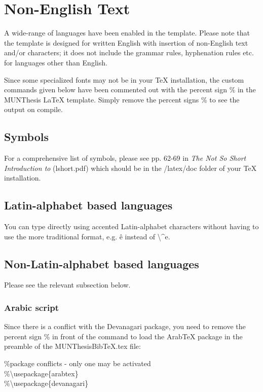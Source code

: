 \documentclass[12pt]{MUNThesisBibTeX}
\begin{document}
\chapter{Non-English Text}

A wide-range of languages have been enabled in the template. Please note that the template is designed for written English with insertion of non-English text and/or characters; it does not include the grammar rules, hyphenation rules etc. for languages other than English. 

Since some specialized fonts may not be in your TeX installation, the custom commands given below have been commented out with the percent sign \% in the MUNThesis LaTeX template. Simply remove the percent signs \% to see the output on compile.

\section{Symbols}
For a comprehensive list of symbols, please see pp. 62-69 in \emph{The Not So Short Introduction to \LaTeXe} (lshort.pdf) which should be in the /latex/doc folder of your TeX installation.

\section{Latin-alphabet based languages}
You can type directly using accented Latin-alphabet characters without having to use the more traditional format, e.g. ê instead of \textbackslash\^{}e. 

\section{Non-Latin-alphabet based languages}
 Please see the relevant subsection below.

\subsection{Arabic script}
Since there is a conflict with the Devanagari package, you need to remove the percent sign \% in front of the command to load the ArabTeX package in the preamble of the MUNThesisBibTeX.tex file:

\%package conflicts - only one may be activated\\
\%\textbackslash usepackage\{arabtex\}\\
\%\textbackslash usepackage\{devanagari\}\\
\end{document}
